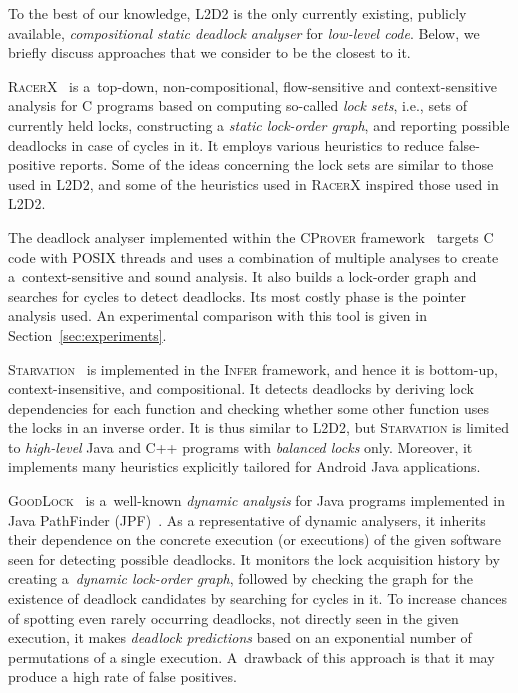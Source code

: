 \documentclass[runningheads]{llncs}
\newcommand{\LLDD}{\textsc{L2D2}\xspace} %
\newcommand{\Infer}{\textsc{Infer}\xspace}
\newcommand{\CProver}{\textsc{CProver}\xspace}
\newcommand{\RacerX}{\textsc{RacerX}\xspace}
\newcommand{\GoodLock}{\textsc{GoodLock}\xspace}
\begin{document}
To the best of our knowledge, \LLDD is the only currently existing, publicly
available, \emph{compositional static deadlock analyser} for \emph{low-level
code}. Below, we briefly discuss approaches that we consider to be the closest
to it.

\RacerX~\cite{racerX03} is a~top-down, non-compositional, flow-sensitive and
context-sensitive analysis for C programs based on computing so-called
\emph{lock sets}, i.e., sets of currently held locks, constructing
a \emph{static lock-order graph}, and reporting possible deadlocks in case of
cycles in it. It employs various heuristics to reduce false-positive reports.
Some of the ideas concerning the lock sets are similar to those used in \LLDD,
and some of the heuristics used in \RacerX inspired those used in \LLDD.

The deadlock analyser implemented within the \CProver
framework~\cite{kroening16} targets C code with POSIX threads and uses a
combination of multiple analyses to create a~context-sensitive and sound
analysis. It also builds a lock-order graph and searches for cycles to detect
deadlocks. Its most costly phase is the pointer analysis used. An experimental
comparison with this tool is given in Section~\ref{sec:experiments}.

\textsc{Starvation}~\cite{deadlock-nikos21} is implemented in the \Infer
framework, and hence it is bottom-up, context-insensitive, and compositional.
It detects deadlocks by deriving lock dependencies for each function and
checking whether some other function uses the locks in an inverse order. It is
thus similar to \LLDD, but \textsc{Starvation} is limited to \emph{high-level}
Java and C++ programs with \emph{balanced locks} only. Moreover, it implements
many heuristics explicitly tailored for Android Java applications.

\GoodLock~\cite{goodlock00} is a~well-known \emph{dynamic analysis} for Java
programs implemented in Java PathFinder (JPF)~\cite{jpf00}. As a representative
of dynamic analysers, it inherits their dependence on the concrete execution (or
executions) of the given software seen for detecting possible deadlocks. It
monitors the lock acquisition history by creating a~\emph{dynamic lock-order
graph}, followed by checking the graph for the existence of deadlock candidates
by searching for cycles in it. To increase chances of spotting even rarely
occurring deadlocks, not directly seen in the given execution, it makes
\emph{deadlock predictions} based on an exponential number of permutations of a
single execution. A~drawback of this approach is that it may produce a high rate
of false positives.
\end{document}
